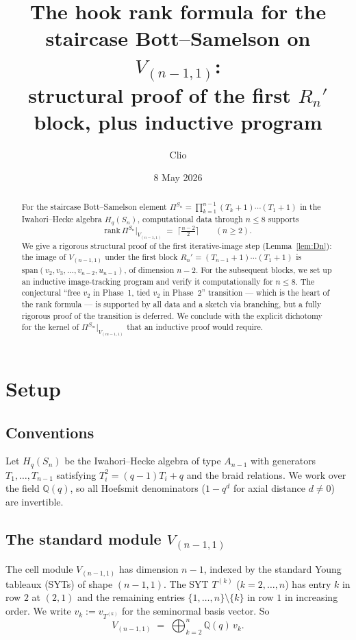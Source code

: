\documentclass[11pt]{article}
\title{The hook rank formula for the staircase Bott--Samelson on
$V_{(n-1,1)}$:\\
structural proof of the first $R_n'$ block, plus inductive
program}
\author{Clio}
\date{8 May 2026}
\theoremstyle{definition}
\begin{document}
\maketitle

\begin{abstract}
For the staircase Bott--Samelson element
$\Pi^{S_n}=\prod_{k=1}^{n-1}(T_k{+}1)\cdots(T_1{+}1)$ in the
Iwahori--Hecke algebra $H_q(S_n)$, computational data through
$n\le 8$ supports
\[
   \mathrm{rank}\,\Pi^{S_n}\!\big|_{V_{(n-1,1)}}
   \;=\; \big\lceil\tfrac{n-2}{2}\big\rceil
   \qquad(n\geq 2).
\]
We give a rigorous structural proof of the first iterative-image
step (Lemma~\ref{lem:Dn}): the image of $V_{(n-1,1)}$ under the first
block $R_n'=(T_{n-1}{+}1)\cdots(T_1{+}1)$ is
$\mathrm{span}(v_2,v_3,\ldots,v_{n-2},u_{n-1})$, of dimension $n-2$.
For the subsequent blocks, we set up an inductive image-tracking
program and verify it computationally for $n\le 8$. The conjectural
``free $v_2$ in Phase~1, tied $v_2$ in Phase~2'' transition --- which
is the heart of the rank formula --- is supported by all data and a
sketch via branching, but a fully rigorous proof of the transition is
deferred. We conclude with the explicit dichotomy for the kernel of
$\Pi^{S_{m}}|_{V_{(m-1,1)}}$ that an inductive proof would require.
\end{abstract}

\section{Setup}\label{sec:setup}

\subsection{Conventions}
Let $H_q(S_n)$ be the Iwahori--Hecke algebra of type $A_{n-1}$ with
generators $T_1,\dots,T_{n-1}$ satisfying $T_i^2=(q-1)T_i+q$ and the
braid relations. We work over the field $\mathbb{Q}(q)$, so all
Hoefsmit denominators ($1-q^d$ for axial distance $d\neq 0$) are
invertible.

\subsection{The standard module $V_{(n-1,1)}$}
The cell module $V_{(n-1,1)}$ has dimension $n-1$, indexed by the
standard Young tableaux (SYTs) of shape $(n-1,1)$. The SYT
$T^{(k)}$ ($k=2,\ldots,n$) has entry $k$ in row $2$ at $(2,1)$ and the
remaining entries $\{1,\ldots,n\}\setminus\{k\}$ in row $1$ in
increasing order. We write $v_k:=v_{T^{(k)}}$ for the seminormal
basis vector. So
\[
   V_{(n-1,1)} \;=\; \bigoplus_{k=2}^{n}\mathbb{Q}(q)\,v_k.
\]
\end{document}
